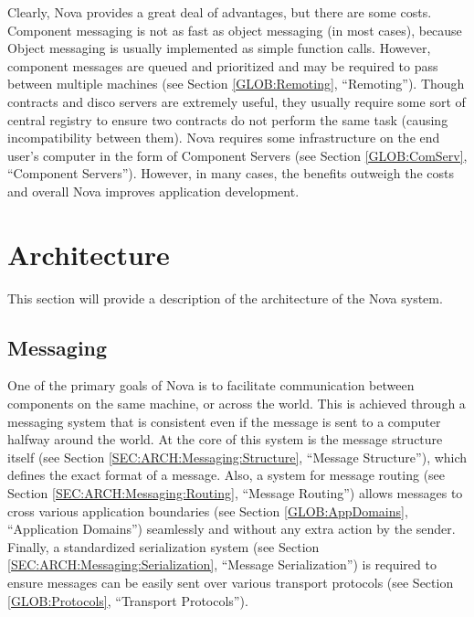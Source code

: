 \documentclass[a4paper,12pt]{article}
\begin{document}
	Clearly, Nova provides a great deal of advantages, but there are some costs. Component messaging is not as fast as object messaging (in most cases), because Object messaging is usually implemented as simple function calls. However, component messages are queued and prioritized and may be required to pass between multiple machines (see Section \ref{GLOB:Remoting}, ``Remoting''). Though contracts and disco servers are extremely useful, they usually require some sort of central registry to ensure two contracts do not perform the same task (causing incompatibility between them). Nova requires some infrastructure on the end user's computer in the form of Component Servers (see Section \ref{GLOB:ComServ}, ``Component Servers''). However, in many cases, the benefits outweigh the costs and overall Nova improves application development.
	
\section{Architecture}
\label{SEC:ARCH}
This section will provide a description of the architecture of the Nova system.

\subsection{Messaging}
\label{SEC:ARCH:Messaging}
\label{GLOB:Messaging}
One of the primary goals of Nova is to facilitate communication between components on the same machine, or across the world. This is achieved through a messaging system that is consistent even if the message is sent to a computer halfway around the world. At the core of this system is the message structure itself (see Section \ref{SEC:ARCH:Messaging:Structure}, ``Message Structure''), which defines the exact format of a message. Also, a system for message routing (see Section \ref{SEC:ARCH:Messaging:Routing}, ``Message Routing'') allows messages to cross various application boundaries (see Section \ref{GLOB:AppDomains}, ``Application Domains'') seamlessly and without any extra action by the sender. Finally, a standardized serialization system (see Section \ref{SEC:ARCH:Messaging:Serialization}, ``Message Serialization'') is required to ensure messages can be easily sent over various transport protocols (see Section \ref{GLOB:Protocols}, ``Transport Protocols'').
\end{document}
